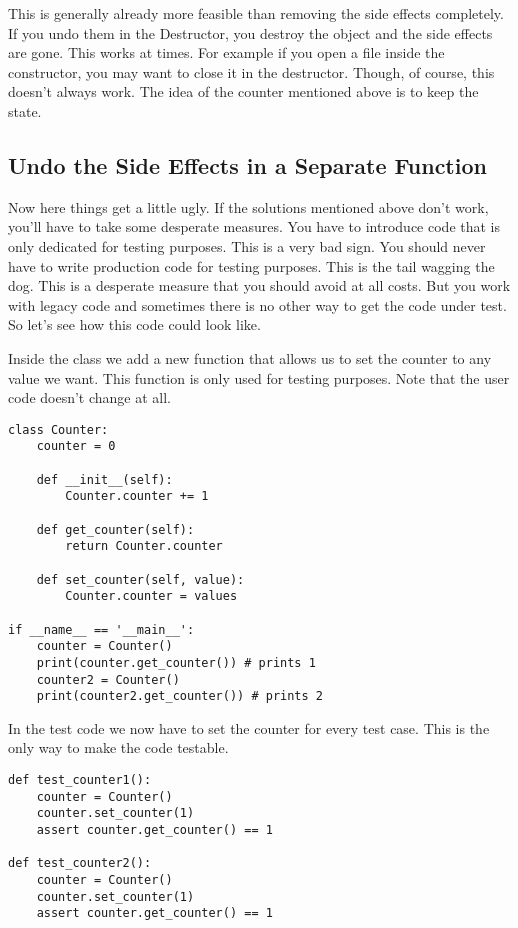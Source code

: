 This is generally already more feasible than removing the side effects completely. If you undo them in the Destructor, you destroy the object and the side effects are gone. This works at times. For example if you open a file inside the constructor, you may want to close it in the destructor. Though, of course, this doesn't always work. The idea of the counter mentioned above is to keep the state.

\subsection{Undo the Side Effects in a Separate Function}

Now here things get a little ugly. If the solutions mentioned above don't work, you'll have to take some desperate measures. You have to introduce code that is only dedicated for testing purposes. This is a very bad sign. You should never have to write production code for testing purposes. This is the tail wagging the dog. This is a desperate measure that you should avoid at all costs. But you work with legacy code and sometimes there is no other way to get the code under test. So let's see how this code could look like.

Inside the class  we add a new function  that allows us to set the counter to any value we want. This function is only used for testing purposes. Note that the user code doesn't change at all.

\begin{programcode}{}
\begin{verbatim}
class Counter:
    counter = 0

    def __init__(self):
        Counter.counter += 1

    def get_counter(self):
        return Counter.counter

    def set_counter(self, value):
        Counter.counter = values

if __name__ == '__main__':
    counter = Counter()
    print(counter.get_counter()) # prints 1
    counter2 = Counter()
    print(counter2.get_counter()) # prints 2
\end{verbatim}
\end{programcode}

In the test code we now have to set the counter for every test case. This is the only way to make the code testable.

\begin{programcode}{}
\begin{verbatim}
def test_counter1():
    counter = Counter()
    counter.set_counter(1)
    assert counter.get_counter() == 1

def test_counter2():
    counter = Counter()
    counter.set_counter(1)
    assert counter.get_counter() == 1
\end{verbatim}
\end{programcode}

